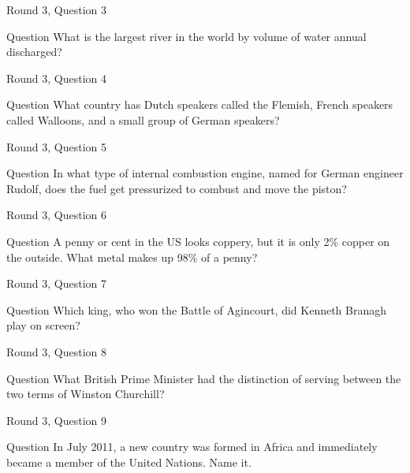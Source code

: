 \documentclass[11pt]{beamer}
\begin{document}
\begin{frame}{Round 3, Question 3}
\begin{block}{Question}
What is the largest river in the world by volume of water annual discharged\@?
\end{block}
\end{frame}
    

\begin{frame}{Round 3, Question 4}
\begin{block}{Question}
What country has Dutch speakers called the Flemish, French speakers called Walloons, and a small group of German speakers\@?
\end{block}
\end{frame}
    

\begin{frame}{Round 3, Question 5}
\begin{block}{Question}
In what type of internal combustion engine, named for German engineer Rudolf, does the fuel get pressurized to combust and move the piston\@?
\end{block}
\end{frame}
    

\begin{frame}{Round 3, Question 6}
\begin{block}{Question}
A penny or cent in the US looks coppery, but it is only 2\% copper on the outside. What metal makes up 98\% of a penny\@?
\end{block}
\end{frame}
    

\begin{frame}{Round 3, Question 7}
\begin{block}{Question}
Which king, who won the Battle of Agincourt, did Kenneth Branagh play on screen\@?
\end{block}
\end{frame}
    

\begin{frame}{Round 3, Question 8}
\begin{block}{Question}
What British Prime Minister had the distinction of serving between the two terms of Winston Churchill\@?
\end{block}
\end{frame}
    

\begin{frame}{Round 3, Question 9}
\begin{block}{Question}
In July 2011, a new country was formed in Africa and immediately became a member of the United Nations. Name it.
\end{block}
\end{frame}
    
\end{document}
